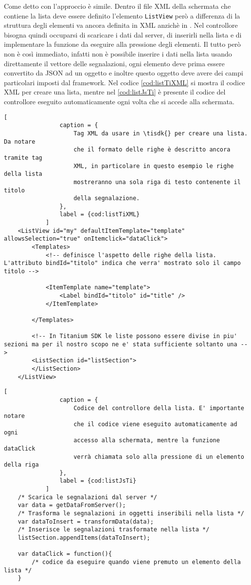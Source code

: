 			\noindent Come detto con \tisdk{} l'approccio è simile. Dentro 
			il file XML della schermata che contiene la lista deve essere definito 
			l'elemento \texttt{ListView} però a differenza di \kendomob{} la struttura 
			degli elementi va ancora definita in XML anzichè in \js{}. Nel controllore 
			bisogna quindi occuparsi di scaricare i dati dal 
			server, di inserirli nella lista e di implementare la funzione 
			da eseguire alla pressione degli elementi. Il tutto però non è così immediato, 
			infatti non è possibile inserire i dati nella lista usando direttamente 
			il vettore delle segnalazioni, ogni elemento deve prima essere convertito 
			da JSON ad un oggetto \js{} e inoltre questo oggetto deve avere dei 
			campi particolari imposti dal framework. Nel codice \ref{cod:listTiXML} si mostra il 
			codice XML per creare una lista, mentre nel \ref{cod:listJsTi} è presente il codice 
			\js{} del controllore eseguito automaticamente ogni volta che si 
			accede alla schermata.
			\begin{lstlisting}[
				caption = {
					Tag XML da usare in \tisdk{} per creare una lista. Da notare 
					che il formato delle righe è descritto ancora tramite tag 
					XML, in particolare in questo esempio le righe della lista 
					mostreranno una sola riga di testo contenente il titolo 
					della segnalazione.
				},
				label = {cod:listTiXML}
			]
	<ListView id="my" defaultItemTemplate="template" allowsSelection="true" onItemclick="dataClick">
        <Templates>
			<!-- definisce l'aspetto delle righe della lista. L'attributo bindId="titolo" indica che verra' mostrato solo il campo titolo -->
			
            <ItemTemplate name="template">
                <Label bindId="titolo" id="title" />
            </ItemTemplate>

        </Templates>

		<!-- In Titanium SDK le liste possono essere divise in piu' sezioni ma per il nostro scopo ne e' stata sufficiente soltanto una -->
        <ListSection id="listSection">
        </ListSection>
	</ListView>
			\end{lstlisting}
			
			\begin{lstlisting}[
				caption = {
					Codice del controllore della lista. E' importante notare 
					che il codice viene eseguito automaticamente ad ogni 
					accesso alla schermata, mentre la funzione dataClick 
					verrà chiamata solo alla pressione di un elemento della riga
				},
				label = {cod:listJsTi}
			]
	/* Scarica le segnalazioni dal server */
	var data = getDataFromServer();
	/* Trasforma le segnalazioni in oggetti inseribili nella lista */
	var dataToInsert = transformData(data);
	/* Inserisce le segnalazioni trasformate nella lista */
	listSection.appendItems(dataToInsert);
	
	var dataClick = function(){
		/* codice da eseguire quando viene premuto un elemento della lista */
	}
			\end{lstlisting}
			

